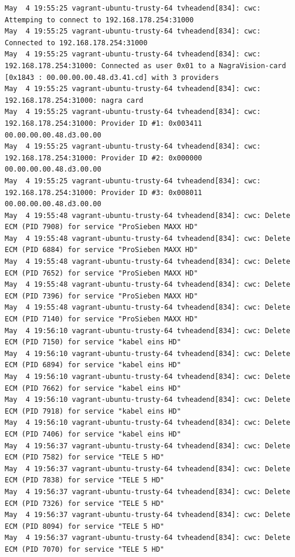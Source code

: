 \begin{cmd}
\begin{Verbatim}[fontsize=\tiny]
May  4 19:55:25 vagrant-ubuntu-trusty-64 tvheadend[834]: cwc: Attemping to connect to 192.168.178.254:31000
May  4 19:55:25 vagrant-ubuntu-trusty-64 tvheadend[834]: cwc: Connected to 192.168.178.254:31000
May  4 19:55:25 vagrant-ubuntu-trusty-64 tvheadend[834]: cwc: 192.168.178.254:31000: Connected as user 0x01 to a NagraVision-card [0x1843 : 00.00.00.00.48.d3.41.cd] with 3 providers
May  4 19:55:25 vagrant-ubuntu-trusty-64 tvheadend[834]: cwc: 192.168.178.254:31000: nagra card
May  4 19:55:25 vagrant-ubuntu-trusty-64 tvheadend[834]: cwc: 192.168.178.254:31000: Provider ID #1: 0x003411 00.00.00.00.48.d3.00.00
May  4 19:55:25 vagrant-ubuntu-trusty-64 tvheadend[834]: cwc: 192.168.178.254:31000: Provider ID #2: 0x000000 00.00.00.00.48.d3.00.00
May  4 19:55:25 vagrant-ubuntu-trusty-64 tvheadend[834]: cwc: 192.168.178.254:31000: Provider ID #3: 0x008011 00.00.00.00.48.d3.00.00
May  4 19:55:48 vagrant-ubuntu-trusty-64 tvheadend[834]: cwc: Delete ECM (PID 7908) for service "ProSieben MAXX HD"
May  4 19:55:48 vagrant-ubuntu-trusty-64 tvheadend[834]: cwc: Delete ECM (PID 6884) for service "ProSieben MAXX HD"
May  4 19:55:48 vagrant-ubuntu-trusty-64 tvheadend[834]: cwc: Delete ECM (PID 7652) for service "ProSieben MAXX HD"
May  4 19:55:48 vagrant-ubuntu-trusty-64 tvheadend[834]: cwc: Delete ECM (PID 7396) for service "ProSieben MAXX HD"
May  4 19:55:48 vagrant-ubuntu-trusty-64 tvheadend[834]: cwc: Delete ECM (PID 7140) for service "ProSieben MAXX HD"
May  4 19:56:10 vagrant-ubuntu-trusty-64 tvheadend[834]: cwc: Delete ECM (PID 7150) for service "kabel eins HD"
May  4 19:56:10 vagrant-ubuntu-trusty-64 tvheadend[834]: cwc: Delete ECM (PID 6894) for service "kabel eins HD"
May  4 19:56:10 vagrant-ubuntu-trusty-64 tvheadend[834]: cwc: Delete ECM (PID 7662) for service "kabel eins HD"
May  4 19:56:10 vagrant-ubuntu-trusty-64 tvheadend[834]: cwc: Delete ECM (PID 7918) for service "kabel eins HD"
May  4 19:56:10 vagrant-ubuntu-trusty-64 tvheadend[834]: cwc: Delete ECM (PID 7406) for service "kabel eins HD"
May  4 19:56:37 vagrant-ubuntu-trusty-64 tvheadend[834]: cwc: Delete ECM (PID 7582) for service "TELE 5 HD"
May  4 19:56:37 vagrant-ubuntu-trusty-64 tvheadend[834]: cwc: Delete ECM (PID 7838) for service "TELE 5 HD"
May  4 19:56:37 vagrant-ubuntu-trusty-64 tvheadend[834]: cwc: Delete ECM (PID 7326) for service "TELE 5 HD"
May  4 19:56:37 vagrant-ubuntu-trusty-64 tvheadend[834]: cwc: Delete ECM (PID 8094) for service "TELE 5 HD"
May  4 19:56:37 vagrant-ubuntu-trusty-64 tvheadend[834]: cwc: Delete ECM (PID 7070) for service "TELE 5 HD"

\end{Verbatim}
\end{cmd}
